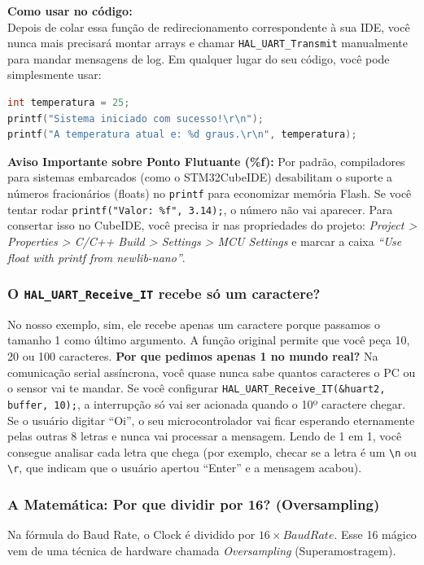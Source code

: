 \documentclass[12pt,a4paper]{article}
\begin{document}
\textbf{Como usar no código:}\\
Depois de colar essa função de redirecionamento correspondente à sua IDE, você nunca mais precisará montar arrays e chamar \texttt{HAL\_UART\_Transmit} manualmente para mandar mensagens de log. Em qualquer lugar do seu código, você pode simplesmente usar:
\begin{lstlisting}[language=C]
int temperatura = 25;
printf("Sistema iniciado com sucesso!\r\n");
printf("A temperatura atual e: %d graus.\r\n", temperatura);
\end{lstlisting}

\textbf{Aviso Importante sobre Ponto Flutuante (\%f):} Por padrão, compiladores para sistemas embarcados (como o STM32CubeIDE) desabilitam o suporte a números fracionários (floats) no \texttt{printf} para economizar memória Flash. Se você tentar rodar \texttt{printf("Valor: \%f", 3.14);}, o número não vai aparecer.
Para consertar isso no CubeIDE, você precisa ir nas propriedades do projeto: \textit{Project > Properties > C/C++ Build > Settings > MCU Settings} e marcar a caixa \textit{``Use float with printf from newlib-nano''}.

\subsubsection{O \texttt{HAL\_UART\_Receive\_IT} recebe só um caractere?}
No nosso exemplo, sim, ele recebe apenas um caractere porque passamos o tamanho 1 como último argumento. A função original permite que você peça 10, 20 ou 100 caracteres.
\textbf{Por que pedimos apenas 1 no mundo real?}
Na comunicação serial assíncrona, você quase nunca sabe quantos caracteres o PC ou o sensor vai te mandar. Se você configurar \texttt{HAL\_UART\_Receive\_IT(\&huart2, buffer, 10);}, a interrupção só vai ser acionada quando o 10º caractere chegar.
Se o usuário digitar ``Oi'', o seu microcontrolador vai ficar esperando eternamente pelas outras 8 letras e nunca vai processar a mensagem. Lendo de 1 em 1, você consegue analisar cada letra que chega (por exemplo, checar se a letra é um \texttt{\textbackslash n} ou \texttt{\textbackslash r}, que indicam que o usuário apertou ``Enter'' e a mensagem acabou).

\subsubsection{A Matemática: Por que dividir por 16? (Oversampling)}
\label{oversampling}
Na fórmula do Baud Rate, o Clock é dividido por $16 \times BaudRate$. Esse 16 mágico vem de uma técnica de hardware chamada \textit{Oversampling} (Superamostragem).
\end{document}
